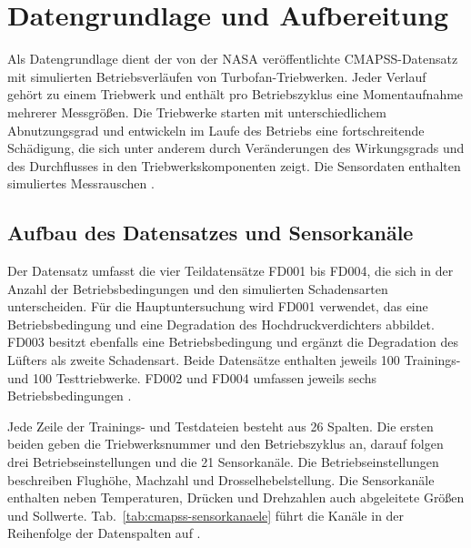 \newpage
\section{Datengrundlage und Aufbereitung}

Als Datengrundlage dient der von der \ac{NASA} veröffentlichte \ac{CMAPSS}-Datensatz mit simulierten Betriebsverläufen von Turbofan-Triebwerken. Jeder Verlauf gehört zu einem Triebwerk und enthält pro Betriebszyklus eine Momentaufnahme mehrerer Messgrößen. Die Triebwerke starten mit unterschiedlichem Abnutzungsgrad und entwickeln im Laufe des Betriebs eine fortschreitende Schädigung, die sich unter anderem durch Veränderungen des Wirkungsgrads und des Durchflusses in den Triebwerkskomponenten zeigt. Die Sensordaten enthalten simuliertes Messrauschen \parencites[5--6]{saxenaDamagePropagationModeling}{nasaCmapssJetEngineData2022}.

\subsection{Aufbau des Datensatzes und Sensorkanäle}

Der Datensatz umfasst die vier Teildatensätze FD001 bis FD004, die sich in der Anzahl der Betriebsbedingungen und den simulierten Schadensarten unterscheiden. Für die Hauptuntersuchung wird FD001 verwendet, das eine Betriebsbedingung und eine Degradation des Hochdruckverdichters abbildet. FD003 besitzt ebenfalls eine Betriebsbedingung und ergänzt die Degradation des Lüfters als zweite Schadensart. Beide Datensätze enthalten jeweils 100 Trainings- und 100 Testtriebwerke. FD002 und FD004 umfassen jeweils sechs Betriebsbedingungen \parencite{nasaCmapssJetEngineData2022}.

Jede Zeile der Trainings- und Testdateien besteht aus 26 Spalten. Die ersten beiden geben die Triebwerksnummer und den Betriebszyklus an, darauf folgen drei Betriebseinstellungen und die 21 Sensorkanäle. Die Betriebseinstellungen beschreiben Flughöhe, Machzahl und Drosselhebelstellung. Die Sensorkanäle enthalten neben Temperaturen, Drücken und Drehzahlen auch abgeleitete Größen und Sollwerte. Tab.~\ref{tab:cmapss-sensorkanaele} führt die Kanäle in der Reihenfolge der Datenspalten auf \parencites[S.~3, Tab.~2 und S.~6--7]{saxenaDamagePropagationModeling}{nasaCmapssJetEngineData2022}.

